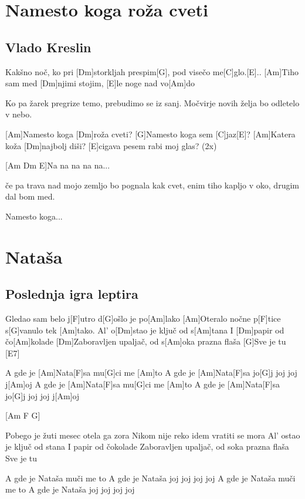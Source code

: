 \documentclass[a4paper,12pt]{article}
\begin{document}
\begin{multicols}{2}
\begin{guitar}
\end{guitar}
\section{Namesto koga roža cveti}
\subsection*{Vlado Kreslin}
\begin{guitar}
[Am]Kakšno noč, ko pri [Dm]storkljah prespim[G], 
pod visečo me[C]glo.[E]..
[Am]Tiho sam med [Dm]njimi stojim, 
[E]le noge nad vo[Am]do


Ko pa žarek pregrize temo, 
prebudimo se iz sanj.
Močvirje novih želja 
bo odletelo v nebo.


[Am]Namesto koga [Dm]roža cveti?
[G]Namesto koga sem [C]jaz[E]?
[Am]Katera koža [Dm]najbolj diši?
[E]cigava pesem rabi moj glas? (2x)


[Am Dm E]Na na na na na...


če pa trava nad mojo zemljo 
bo pognala kak cvet, 
enim tiho kapljo v oko, 
drugim dal bom med.


Namesto koga...

\end{guitar}
\section{Nataša}
\subsection*{Poslednja igra leptira}
\begin{guitar}
[Am]Gledao sam belo j[F]utro d[G]ošlo je po[Am]lako
[Am]Oteralo nočne p[F]tice s[G]vanulo tek [Am]tako.
Al’ o[Dm]stao je ključ od s[Am]tana I [Dm]papir od čo[Am]kolade
[Dm]Zaboravljen upaljač, od s[Am]oka prazna flaša
[G]Sve je tu [E7]


A gde je [Am]Nata[F]sa mu[G]ci me [Am]to
A gde je [Am]Nata[F]sa jo[G]j joj joj j[Am]oj
A gde je [Am]Nata[F]sa mu[G]ci me [Am]to
A gde je [Am]Nata[F]sa jo[G]j joj joj j[Am]oj

[Am F G]

Pobego je žuti mesec otela ga zora
Nikom nije reko idem vratiti se mora    
Al’ ostao je ključ od stana I papir od čokolade
Zaboravljen upaljač, od soka prazna flaša
Sve je tu


A gde je Nataša muči me to
A gde je Nataša joj joj joj joj
A gde je Nataša muči me to
A gde je Nataša joj joj joj joj


\end{guitar}
\end{multicols}
\end{document}
